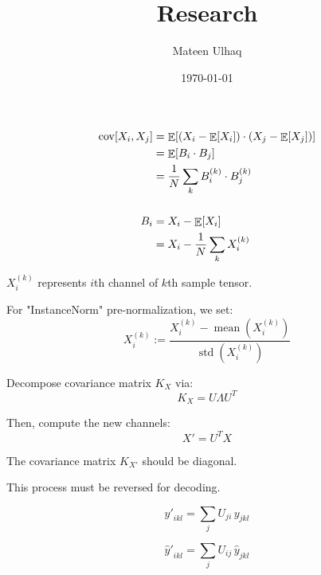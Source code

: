\documentclass[12pt]{extarticle}
\title{Research}
\author{Mateen Ulhaq}
\date{\today}
\DeclareMathOperator{\cov}{cov}
\DeclareMathOperator{\EV}{\mathbb{E}}
\DeclareMathOperator{\mean}{mean}
\DeclareMathOperator{\std}{std}
\begin{document}
\maketitle

\begin{align*}
  \cov[X_i, X_j]
    &= \EV[(X_i - \EV[X_i]) \cdot (X_j - \EV[X_j])] \\
    &= \EV[B_i \cdot B_j] \\
    &= \frac{1}{N} \sum_k {B_i^{(k)} \cdot B_j^{(k)}} \\[\baselineskip]
  B_i
    &= X_i - \EV[X_i] \\
    &= X_i - \frac{1}{N} \sum_k X_i^{(k)}
\end{align*}

$X_i^{(k)}$ represents $i$th channel of $k$th sample tensor.

\bigskip

For "InstanceNorm" pre-normalization, we set:
\[ X_i^{(k)} := \frac{X_i^{(k)} - \mean(X_i^{(k)})}{\std(X_i^{(k)})} \]

\bigskip

Decompose covariance matrix $K_X$ via:
\[ K_X = U \Lambda U^T \]

Then, compute the new channels:
\[ X' = U^T X \]

The covariance matrix $K_{X'}$ should be diagonal.

\bigskip
This process must be reversed for decoding.

\bigskip

\[ {y'}_{ikl} = \sum_j U_{ji} \, y_{jkl} \]

\bigskip

\[ {\hat{y}'}_{ikl} = \sum_j U_{ij} \, \hat{y}_{jkl} \]
\end{document}
